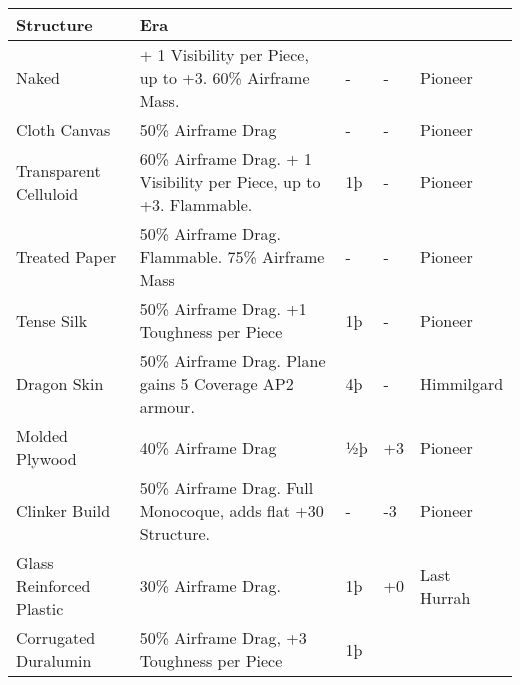 \documentclass{article}
\begin{document}
\begin{tabular}{|l|l|l|l|l|}
    Structure                    & Era                                                                                          \\\hline
    Naked                        & + 1 Visibility per Piece, up to +3. 60\% Airframe Mass. & -          & -
                                 & Pioneer                                                                                      \\\hline
    Cloth Canvas                 & 50\% Airframe Drag                                      & -          & -           & Pioneer \\\hline
    Transparent Celluloid        & {60\% Airframe Drag. + 1 Visibility per
    Piece, up to +3. Flammable.} & {1þ}                                                    & {-}        &
    {Pioneer}                                                                                                                   \\\hline
    Treated Paper                & 50\% Airframe Drag. Flammable. 75\% Airframe Mass       & -          &
    -                            & Pioneer                                                                                      \\\hline
    Tense Silk                   & 50\% Airframe Drag. +1 Toughness per Piece              & 1þ         & -           &
    Pioneer                                                                                                                     \\\hline
    Dragon Skin                  & 50\% Airframe Drag. Plane gains 5 Coverage AP2 armour.  &
    4þ                           & -                                                       & Himmilgard                         \\\hline
    Molded Plywood               & 40\% Airframe Drag                                      & ½þ         & +3          & Pioneer \\\hline
    Clinker Build                & 50\% Airframe Drag. Full Monocoque, adds flat +30
    Structure.                   & -                                                       & -3         & Pioneer               \\\hline
    Glass Reinforced Plastic     & 30\% Airframe Drag.                                     & 1þ         & +0          & Last
    Hurrah                                                                                                                      \\\hline
    Corrugated Duralumin         & 50\% Airframe Drag, +3 Toughness per Piece              & 1þ         &

\end{tabular}
\end{document}
